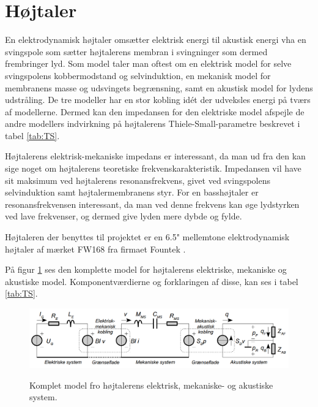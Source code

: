 \section{Højtaler}


En elektrodynamisk højtaler omsætter elektrisk energi til akustisk energi vha en svingspole som sætter højtalerens membran i svingninger som dermed frembringer lyd. Som model taler man oftest om en elektrisk model for selve svingspolens kobbermodstand og selvinduktion, en mekanisk model for membranens masse og udsvingets begrænsning, samt en akustisk model for lydens udstråling.
De tre modeller har en stor kobling idét der udveksles energi på tværs af modellerne. Dermed kan den impedansen for den elektriske model afspejle de andre modellers indvirkning på højtalerens Thiele-Small-parametre beskrevet i tabel \ref{tab:TS}.

Højtalerens elektrisk-mekaniske impedans er interessant, da man ud fra den kan sige noget om højtalerens teoretiske frekvenskarakteristik. Impedansen vil have sit maksimum ved højtalerens resonansfrekvens, givet ved svingspolens selvinduktion samt højtalermembranens styr. For en basshøjtaler er resonansfrekvensen interessant, da man ved denne frekvens kan øge lydstyrken ved lave frekvenser, og dermed give lyden mere dybde og fylde.

Højtaleren der benyttes til projektet er en 6.5" mellemtone elektrodynamisk højtaler af mærket FW168\cite{FW168} fra firmaet Fountek \cite{Fountek}. 

På figur \ref{fig:kompletmodel} ses den komplette model for højtalerens elektriske, mekaniske og akustiske model.\citep{Elektroakustik} Komponentværdierne og forklaringen af disse, kan ses i tabel \ref{tab:TS}.

\begin{figure}[H]
	\centering
	\includegraphics[width=\textwidth]{Pics/kompletmodel.PNG}
	\label{fig:kompletmodel}
	\caption{Komplet model fro højtalerens elektrisk, mekaniske- og akustiske system.\cite{Elektroakustik} } 
\end{figure}

